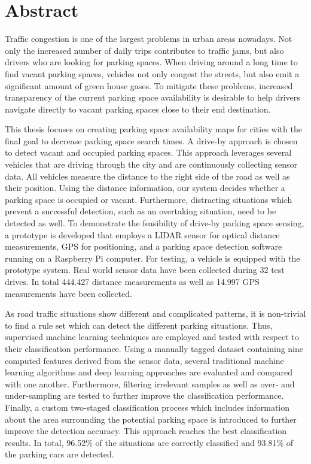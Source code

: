 

\chapter*{Abstract}

Traffic congestion is one of the largest problems in urban areas nowadays. Not only the increased number of daily trips contributes to traffic jams, but also drivers who are looking for parking spaces. When driving around a long time to find vacant parking spaces, vehicles not only congest the streets, but also emit a significant amount of green house gases. To mitigate these problems, increased transparency of the current parking space availability is desirable to help drivers navigate directly to vacant parking spaces close to their end destination. 

This thesis focuses on creating parking space availability maps for cities with the final goal to decrease parking space search times. A drive-by approach is chosen to detect vacant and occupied parking spaces. This approach leverages several vehicles that are driving through the city and are continuously collecting sensor data. All vehicles measure the distance to the right side of the road as well as their position. Using the distance information, our system decides whether a parking space is occupied or vacant. Furthermore, distracting situations which prevent a successful detection, such as an overtaking situation, need to be detected as well. 
To demonstrate the feasibility of drive-by parking space sensing, a prototype is developed that employs a LIDAR sensor for optical distance measurements, GPS for positioning, and a parking space detection software running on a Raspberry Pi computer.
For testing, a vehicle is equipped with the prototype system. Real world sensor data have been collected during 32 test drives. In total 444.427 distance measurements as well as 14.997 GPS measurements have been collected.

As road traffic situations show different and complicated patterns, it is non-trivial to find a rule set which can detect the different parking situations. Thus, supervised machine learning techniques are employed and tested with respect to their classification performance. Using a manually tagged dataset containing nine computed features derived from the sensor data, several traditional machine learning algorithms and deep learning approaches are evaluated and compared with one another. Furthermore, filtering irrelevant samples as well as over- and under-sampling are tested to further improve the classification performance. 
Finally, a custom two-staged classification process which includes information about the area surrounding the potential parking space is introduced to further improve the detection accuracy. This approach reaches the best classification results. In total, 96.52\% of the situations are correctly classified and 93.81\% of the parking cars are detected.


